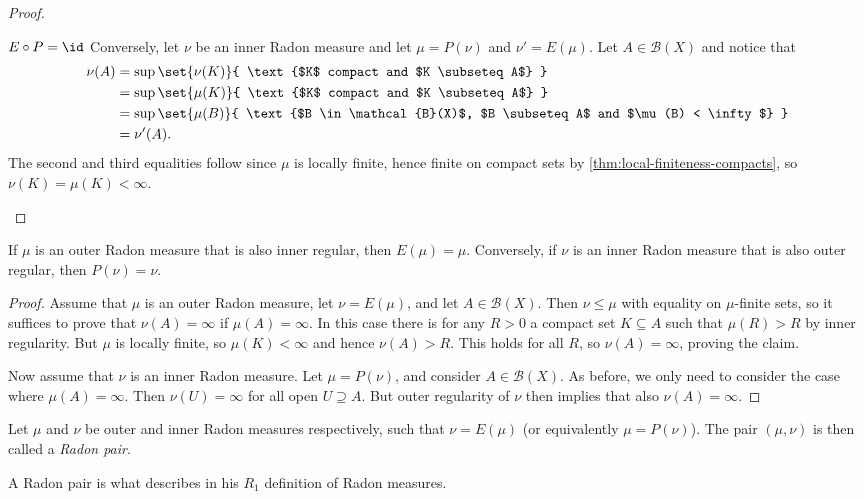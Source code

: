 \documentclass[article, a4paper, 11pt, oneside]{memoir}
\numberwithin{equation}{chapter}
\newcommand{\calB}{\mathcal{B}}
\newcommand{\borel}[1]{\calB(#1)}
\begin{document}
\begin{proof}
\begin{proofsec}
    \item[$E \circ P = \id$]
    Conversely, let $\nu$ be an inner Radon measure and let $\mu = P(\nu)$ and $\nu' = E(\mu)$. Let $A \in \borel{X}$ and notice that
    \begin{align*}
        \nu(A)
            &= \sup \set{\nu(K)}{ \text{$K$ compact and $K \subseteq A$} } \\
            &= \sup \set{\mu(K)}{ \text{$K$ compact and $K \subseteq A$} } \\
            &= \sup \set{\mu(B)}{ \text{$B \in \borel{X}$, $B \subseteq A$ and $\mu(B) < \infty$} } \\
            &= \nu'(A).
    \end{align*}
    The second and third equalities follow since $\mu$ is locally finite, hence finite on compact sets by \cref{thm:local-finiteness-compacts}, so $\nu(K) = \mu(K) < \infty$.
\end{proofsec}
\end{proof}


\begin{proposition}
    If $\mu$ is an outer Radon measure that is also inner regular, then $E(\mu) = \mu$. Conversely, if $\nu$ is an inner Radon measure that is also outer regular, then $P(\nu) = \nu$.
\end{proposition}

\begin{proof}
    Assume that $\mu$ is an outer Radon measure, let $\nu = E(\mu)$, and let $A \in \borel{X}$. Then $\nu \leq \mu$ with equality on $\mu$-finite sets, so it suffices to prove that $\nu(A) = \infty$ if $\mu(A) = \infty$. In this case there is for any $R > 0$ a compact set $K \subseteq A$ such that $\mu(R) > R$ by inner regularity. But $\mu$ is locally finite, so $\mu(K) < \infty$ and hence $\nu(A) > R$. This holds for all $R$, so $\nu(A) = \infty$, proving the claim.

    Now assume that $\nu$ is an inner Radon measure. Let $\mu = P(\nu)$, and consider $A \in \borel{X}$. As before, we only need to consider the case where $\mu(A) = \infty$. Then $\nu(U) = \infty$ for all open $U \supseteq A$. But outer regularity of $\nu$ then implies that also $\nu(A) = \infty$.
\end{proof}




\begin{definition}
    \label{def:Radon-pairs}
    Let $\mu$ and $\nu$ be outer and inner Radon measures respectively, such that $\nu = E(\mu)$ (or equivalently $\mu = P(\nu)$). The pair $(\mu,\nu)$ is then called a \emph{Radon pair}\footnotemark{}.
\end{definition}
%
A Radon pair is what \textcite{schwartz1973} describes in his $R_1$ definition of Radon measures.
\end{document}
